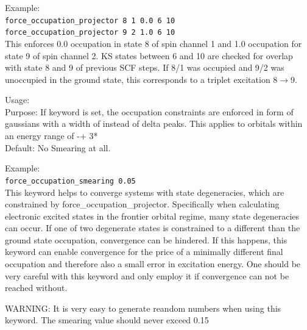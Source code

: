   Example: \\[1.0ex]
  \texttt{force\_occupation\_projector  8  1 0.0 6 10} \\
  \texttt{force\_occupation\_projector  9  2 1.0 6 10} \\

This enforces 0.0 occupation in state 8 of spin channel 1 
and 1.0 occupation for state 9 of spin channel 2. KS states 
between 6 and 10 are checked for overlap with state 8 and 9 
of previous SCF steps. If 8/1 was occupied and 9/2 was unoccupied 
in the ground state, this corresponds to a triplet excitation 8$\rightarrow$9.

{
  \noindent
  Usage:   \\[1.0ex]
  Purpose: If keyword is set, the occupation constraints are enforced in form of gaussians 
  with a width of  instead of delta peaks. This applies to
  orbitals within an energy range of -+ 3* \\[1.0ex]
  Default: No Smearing at all. \\
}

  Example: \\[1.0ex]
  \texttt{force\_occupation\_smearing  0.05} \\

This keyword helps to converge systems with state degeneracies, which are 
constrained by force\_occupation\_projector. Specifically 
when calculating electronic excited states in the frontier orbital regime, many state 
degeneracies can occur. If one of two degenerate states is constrained to a different 
than the ground state occupation, convergence can be hindered. If this happens, 
this keyword can enable convergence for the price of a minimally different final occupation 
and therefore also a small error in excitation energy. One should be very careful with 
this keyword and only employ it if convergence can not be reached without.

WARNING: It is very easy to generate reandom numbers when using this keyword. The 
smearing value should never exceed 0.15
